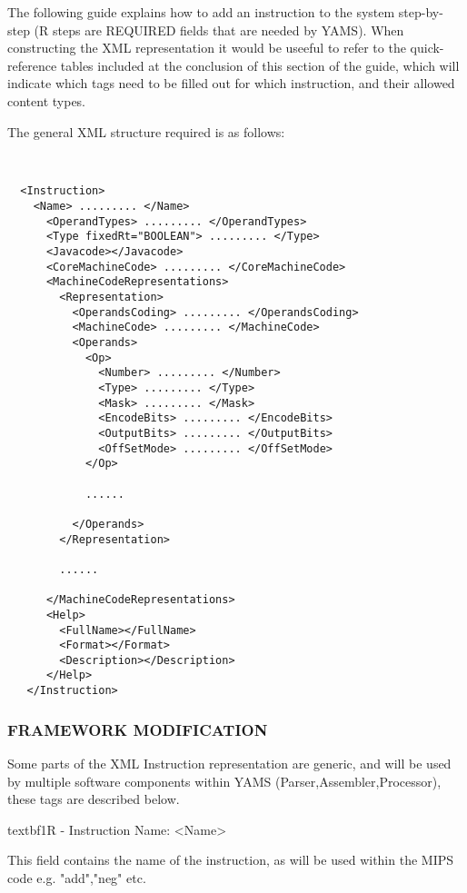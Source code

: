 \documentclass[12pt]{report}
\begin{document}
The following guide  explains how to add an instruction to the system step-by-step (R steps are REQUIRED fields that are needed by YAMS). When constructing the XML representation it would be useeful to refer to the quick-reference tables included at the conclusion of this section of the guide, which will indicate which tags need to be filled out for which instruction, and their allowed content types.

The general XML structure required is as follows:

 \begin{verbatim}


  <Instruction>
    <Name> ......... </Name>
      <OperandTypes> ......... </OperandTypes>
      <Type fixedRt="BOOLEAN"> ......... </Type>
      <Javacode></Javacode>
      <CoreMachineCode> ......... </CoreMachineCode>
      <MachineCodeRepresentations>
        <Representation>
          <OperandsCoding> ......... </OperandsCoding>
          <MachineCode> ......... </MachineCode>
          <Operands>
            <Op>
              <Number> ......... </Number>
              <Type> ......... </Type>
              <Mask> ......... </Mask>
              <EncodeBits> ......... </EncodeBits>
              <OutputBits> ......... </OutputBits>
              <OffSetMode> ......... </OffSetMode>
            </Op>

            ......

          </Operands>
        </Representation>

        ......

      </MachineCodeRepresentations>
      <Help>
        <FullName></FullName>
        <Format></Format>
        <Description></Description>
      </Help>
   </Instruction>

 \end{verbatim}


\subsubsection{FRAMEWORK MODIFICATION}

Some parts of the XML Instruction representation are generic, and will be used by multiple software components within YAMS (Parser,Assembler,Processor), these tags are described below.

textbf{1R - Instruction Name: <Name> }

This field contains the name of the instruction, as will be used within the MIPS code e.g. "add","neg" etc.
\end{document}
